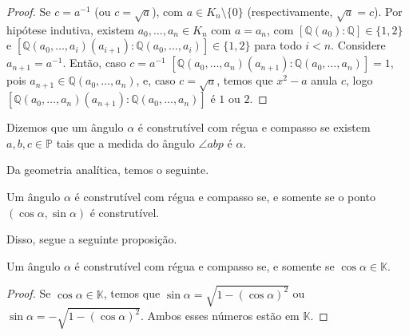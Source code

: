 \begin{proof}
    Se $c=a^{-1}$ (ou $c=\sqrt a$), com $a\in K_n\setminus\{0\}$ (respectivamente, $\sqrt a=c$). Por hipótese indutiva, existem $a_0, \dots, a_n\in K_n$ com $a=a_n$, com $[\mathbb Q(a_0): \mathbb Q]\in \{1, 2\}$ e $[\mathbb Q(a_0, \dots, a_i)(a_{i+1}):\mathbb Q(a_0, \dots, a_i)]\in \{1, 2\}$ para todo $i<n$. Considere $a_{n+1}=a^{-1}$. Então, caso $c=a^{-1}$ $[\mathbb Q(a_0, \dots, a_n)(a_{n+1}):\mathbb Q(a_0, \dots, a_n)]=1$, pois $a_{n+1}\in \mathbb Q(a_0, \dots, a_n)$, e, caso $c=\sqrt a$, temos que $x^2-a$ anula $c$, logo $[\mathbb Q(a_0, \dots, a_n)(a_{n+1}):\mathbb Q(a_0, \dots, a_n)]$ é $1$ ou $2$.
\end{proof}

\begin{definition}
Dizemos que um ângulo $\alpha$ é construtível com régua e compasso se existem $a, b, c \in \mathbb P$ tais que a medida do ângulo $\angle{abp}$ é $\alpha$.
\end{definition}

Da geometria analítica, temos o seguinte.
\begin{prop}
    Um ângulo $\alpha$ é construtível com régua e compasso se, e somente se o ponto $(\cos \alpha, \sin \alpha)$ é construtível.
\end{prop}
Disso, segue a seguinte proposição.
\begin{prop}
    Um ângulo $\alpha$ é construtível com régua e compasso se, e somente se $\cos \alpha \in \mathbb K$.
\end{prop}
\begin{proof}
Se $\cos \alpha \in \mathbb K$, temos que $\sin \alpha=\sqrt{1-(\cos \alpha)^2}$ ou $\sin \alpha=-\sqrt{1-(\cos \alpha)^2}$. Ambos esses números estão em $\mathbb K$.
\end{proof}

